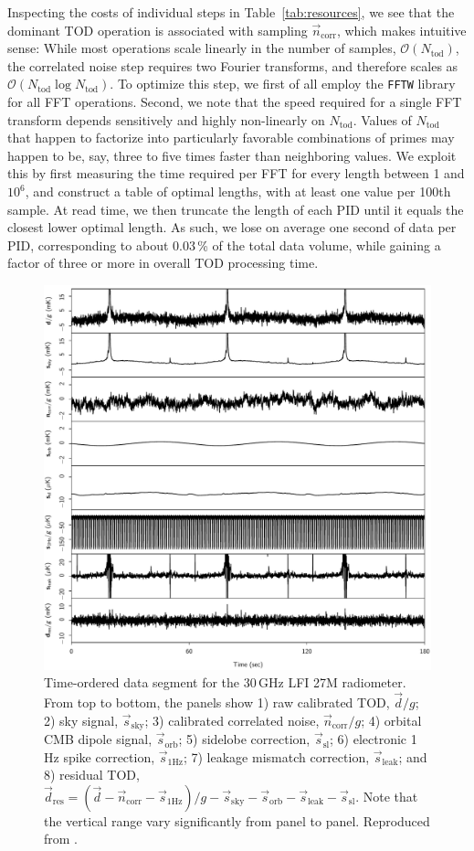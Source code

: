 \documentclass[onecolumn]{aa}
\renewcommand{\d}[0]{\vec{d}}
\newcommand{\n}[0]{\vec{n}}
\newcommand{\s}[0]{\vec{s}}
\begin{document}
Inspecting the costs of individual steps in Table~\ref{tab:resources},
we see that the dominant TOD operation is associated with sampling
$\n_{\mathrm{corr}}$, which makes intuitive sense: While most
operations scale linearly in the number of samples,
$\mathcal{O}(N_{\mathrm{tod}})$, the correlated noise step requires
two Fourier transforms, and therefore scales as
$\mathcal{O}(N_{\mathrm{tod}}\log N_{\mathrm{tod}})$. To optimize this
step, we first of all employ the \texttt{FFTW} library \citep{FFTW05} for all
FFT operations. Second, we note that the speed required for a single
FFT transform depends sensitively and highly non-linearly on
$N_{\mathrm{tod}}$. Values of $N_{\mathrm{tod}}$ that happen to
factorize into particularly favorable combinations of primes may
happen to be, say, three to five times faster than neighboring
values. We exploit this by first measuring the time required per FFT
for every length between 1 and $10^6$, and construct a table of
optimal lengths, with at least one value per 100th sample. At read
time, we then truncate the length of each PID until it equals the
closest lower optimal length. As such, we lose on average one second of
data per PID, corresponding to about 0.03\,\% of the total data
volume, while gaining a factor of three or more in overall TOD
processing time.

\begin{figure}[t]
  \center
  \includegraphics[width=0.5\linewidth]{figs/tod_27M_pid1000_v1.pdf}
  \caption{Time-ordered data segment for the 30\,GHz LFI 27M
    radiometer. From top to bottom, the panels show 1) raw calibrated
    TOD, $\d/g$; 2) sky signal, $\s_{\mathrm{sky}}$; 3) calibrated
    correlated noise, $\n_{\mathrm{corr}}/g$; 4) orbital CMB dipole
    signal, $\s_{\mathrm{orb}}$; 5) sidelobe correction,
    $\s_{\mathrm{sl}}$; 6) electronic 1\,Hz spike correction,
    $\s_{\mathrm{1Hz}}$; 7) leakage mismatch correction,
    $\s_{\mathrm{leak}}$; and 8) residual TOD, $\d_{\mathrm{res}} =
    (\d-\n_{\mathrm{corr}} - \s_{\mathrm{1Hz}})/g - \s_{\mathrm{sky}}
    - \s_{\mathrm{orb}} - \s_{\mathrm{leak}} - \s_{\mathrm{sl}}$. Note
    that the vertical range vary significantly from panel to
    panel. Reproduced from \citet{bp10}.}
  \label{fig:todplot}
\end{figure}
\end{document}

